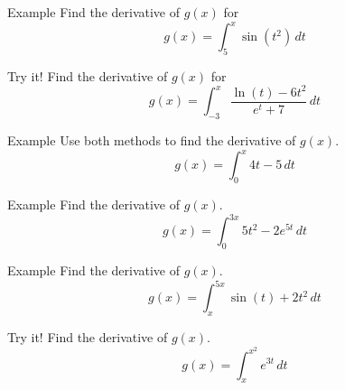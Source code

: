 \documentclass[t]{beamer}
\begin{document}
\begin{frame}{Example}
Find the derivative of $g(x)$ for
$$g(x) = \int_5^x \sin(t^2) \, dt$$
\end{frame}

\begin{frame}{Try it!}
Find the derivative of $g(x)$ for
$$g(x) = \int_{-3}^x \frac{\ln(t) - 6t^2}{e^t + 7} \, dt $$
\end{frame}

\begin{frame}{Example}
Use both methods to find the derivative of $g(x)$.
$$g(x) = \int_0^x 4t - 5 \, dt$$
\end{frame}

\begin{frame}{Example}
Find the derivative of $g(x)$.
$$g(x) = \int_0^{3x} 5t^2 - 2e^{5t} \, dt$$
\end{frame}

\begin{frame}{Example}
Find the derivative of $g(x)$.
$$g(x) = \int_x^{5x} \sin(t) + 2t^2 \, dt$$
\end{frame}

\begin{frame}{Try it!}
Find the derivative of $g(x)$.
$$g(x) = \int_x^{x^2} e^{3t} \, dt $$
\end{frame}
\end{document}
